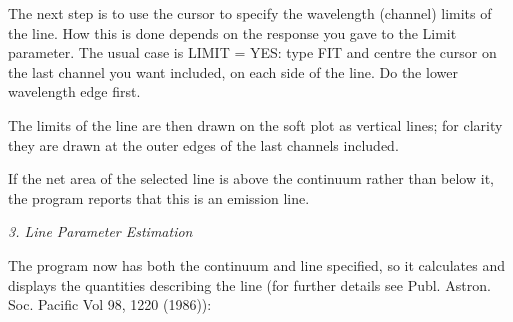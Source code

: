The next step is to use the cursor to specify the wavelength (channel) 
limits of the line. How this is done depends on the response you gave to 
the Limit parameter.
The usual case is LIMIT = YES: type FIT and centre the 
cursor on the last channel you want included, on each side of the line. Do 
the lower wavelength edge first.

The limits of the line are then drawn on the soft plot as vertical lines; 
for clarity they are drawn at the outer edges of the last channels 
included.

If the net area of the selected line is above the continuum rather than 
below it, the program reports that this is an emission line.


\goodbreak
\vspace{12pt}
{\it 3. Line Parameter Estimation}

The program now has both the continuum and line specified, so it 
calculates and displays the quantities describing the line (for further
details see Publ. Astron. Soc. Pacific Vol 98, 1220 (1986)):

